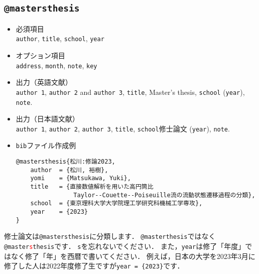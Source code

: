 \documentclass[a4paper,fleqn,uplatex,dvipdfmx]{jsarticle}
\makeatletter
\newcommand{\ttmastersthesis}{\texttt{@mastersthesis}}
\makeatother
\begin{document}
\subsection{\ttmastersthesis}
\label{ssec:mastersthesis}
\begin{screen}
    \begin{itemize}
        \item 必須項目 \\
        \verb|author|, \verb|title|, \verb|school|, \verb|year|
        \item オプション項目 \\
        \verb|address|, \verb|month|, \verb|note|, \verb|key|
        \item 出力（英語文献） \\
            \colorbox[gray]{0.8}{\texttt{author 1}}, \colorbox[gray]{0.8}{\texttt{author 2}} and \colorbox[gray]{0.8}{\texttt{author 3}}, \colorbox[gray]{0.8}{\texttt{title}}, Master's thesis, \colorbox[gray]{0.8}{\texttt{school}} (\colorbox[gray]{0.8}{\texttt{year}}), \colorbox[gray]{0.8}{\texttt{note}}.
        \item 出力（日本語文献） \\
            \colorbox[gray]{0.8}{\texttt{author 1}}, \colorbox[gray]{0.8}{\texttt{author 2}}, \colorbox[gray]{0.8}{\texttt{author 3}}, \colorbox[gray]{0.8}{\texttt{title}}, \colorbox[gray]{0.8}{\texttt{school}}修士論文 (\colorbox[gray]{0.8}{\texttt{year}}), \colorbox[gray]{0.8}{\texttt{note}}.
        \item \verb|bib|ファイル作成例 \vspace{-3mm}
\begin{verbatim}
@mastersthesis{松川:修論2023,
    author  = {松川, 裕樹},
    yomi    = {Matsukawa, Yuki},
    title   = {直接数値解析を用いた高円筒比
                Taylor--Couette--Poiseuille流の流動状態遷移過程の分類},
    school  = {東京理科大学大学院理工学研究科機械工学専攻},
    year    = {2023}
}
\end{verbatim}
    \end{itemize}
\end{screen}

修士論文は\ttmastersthesis に分類します．
\verb|@masterthesis|ではなく\texttt{@master\textcolor{red}{s}thesis}です．
\verb|s|を忘れないでください．
また，\verb|year|は修了「年度」ではなく修了「年」を西暦で書いてください．
例えば，日本の大学を2023年3月に修了した人は2022年度修了生ですが\verb|year = {2023}|です．
\end{document}
